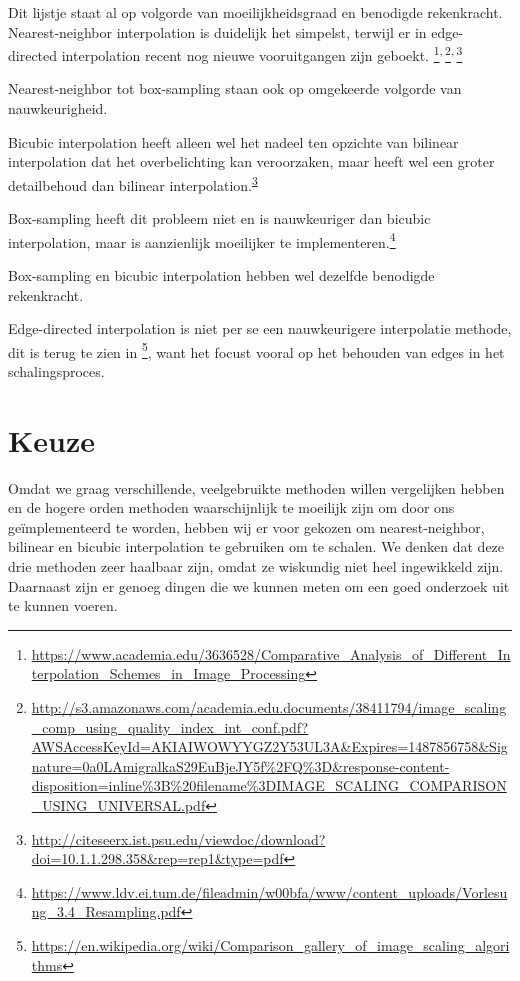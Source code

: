 \documentclass[a4paper]{article}
\begin{document}
Dit lijstje staat al op volgorde van moeilijkheidsgraad en benodigde
rekenkracht. Nearest-neighbor interpolation is duidelijk het simpelst,
terwijl er in edge-directed interpolation recent nog nieuwe
vooruitgangen zijn geboekt. \footnote{\url{https://www.academia.edu/3636528/Comparative\_Analysis\_of\_Different\_Interpolation\_Schemes\_in\_Image\_Processing}}\textsuperscript{,}\,\footnote{\url{http://s3.amazonaws.com/academia.edu.documents/38411794/image\_scaling\_comp\_using\_quality\_index\_int\_conf.pdf?AWSAccessKeyId=AKIAIWOWYYGZ2Y53UL3A\&Expires=1487856758\&Signature=0a0LAmigralkaS29EuBjeJY5f\%2FQ\%3D\&response-content-disposition=inline\%3B\%20filename\%3DIMAGE\_SCALING\_COMPARISON\_USING\_UNIVERSAL.pdf}}\textsuperscript{,}\,\footnote{\url{http://citeseerx.ist.psu.edu/viewdoc/download?doi=10.1.1.298.358\&rep=rep1\&type=pdf}\label{org9a221fd}}

Nearest-neighbor tot box-sampling staan ook op omgekeerde volgorde van
nauwkeurigheid.

Bicubic interpolation heeft alleen wel het nadeel ten opzichte van
bilinear interpolation dat het overbelichting kan veroorzaken, maar
heeft wel een groter detailbehoud dan bilinear interpolation.\textsuperscript{\ref{org9a221fd}}


Box-sampling heeft dit probleem niet en is nauwkeuriger
dan bicubic interpolation, maar is aanzienlijk moeilijker te
implementeren.\footnote{\url{https://www.ldv.ei.tum.de/fileadmin/w00bfa/www/content\_uploads/Vorlesung\_3.4\_Resampling.pdf}}

Box-sampling en bicubic interpolation hebben wel dezelfde benodigde
rekenkracht.

Edge-directed interpolation is niet per se een nauwkeurigere
interpolatie methode, dit is terug te zien in \footnote{\url{https://en.wikipedia.org/wiki/Comparison\_gallery\_of\_image\_scaling\_algorithms}}, want het focust
vooral op het behouden van edges in het schalingsproces.

\section{Keuze}
\label{sec:org7976538}
Omdat we graag verschillende, veelgebruikte methoden willen
vergelijken hebben en de hogere orden methoden waarschijnlijk te
moeilijk zijn om door ons geïmplementeerd te worden, hebben wij er
voor gekozen om nearest-neighbor, bilinear en bicubic interpolation te
gebruiken om te schalen. We denken dat deze drie methoden zeer
haalbaar zijn, omdat ze wiskundig niet heel ingewikkeld
zijn. Daarnaast zijn er genoeg dingen die we kunnen meten om een goed
onderzoek uit te kunnen voeren.
\end{document}
